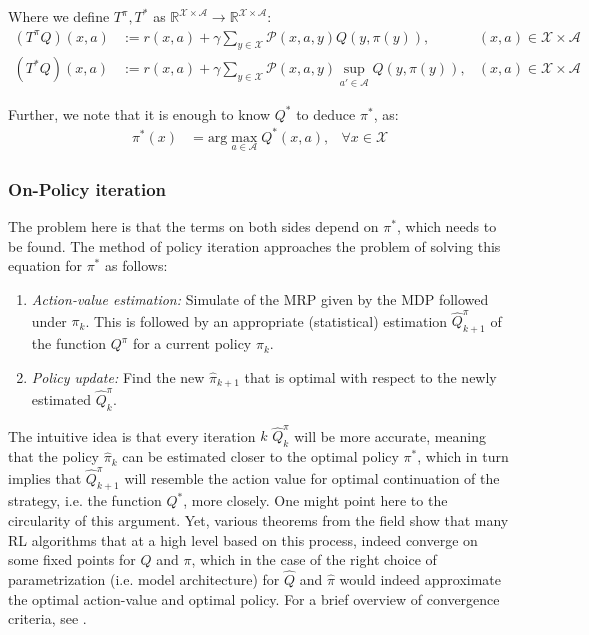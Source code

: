 \documentclass{article}
\theoremstyle{definition}
\theoremstyle{remark}
\newcommand{\stat}{\mathcal{X}}
\newcommand{\act}{\mathcal{A}}
\newcommand{\prob}{\mathcal{P}}
\newcommand{\R}{\mathbb{R}}
\begin{document}
Where we define $T^\pi, T^*$ as $\R^{\stat\times \act} \rightarrow \R^{\stat\times \act}$: 
\begin{align}
    (T^\pi Q)(x,a) &:= r(x,a) + \gamma \sum_{y\in \stat} \prob(x,a,y)Q(y,\pi(y)), & (x,a)\in \stat \times \act \\
    (T^* Q)(x,a) &:= r(x,a) + \gamma \sum_{y\in \stat} \prob(x,a,y)\sup_{a'\in \act}Q(y,\pi(y)), & (x,a)\in \stat \times \act
\end{align}

Further, we note that it is enough to know $Q^*$ to deduce $\pi^*$, as:
\begin{align}
    \pi^*(x) &= \text{arg}\max_{a\in \mathcal{A}} Q^* (x,a), &\forall x \in \mathcal{X}
\end{align}

\subsubsection{On-Policy iteration}
The problem here is that the terms on both sides depend on $\pi^*$, which needs to be found. The method of policy iteration approaches the problem of solving this equation for $\pi^*$ as follows:

\begin{enumerate}
    \item \textit{Action-value estimation:} Simulate of the MRP given by the MDP followed under $\pi_k$. This is followed by an appropriate (statistical) estimation $\hat Q^\pi_{k+1}$ of the function $Q^\pi$ for a current policy $\pi_k$.
    
    \item \textit{Policy update:} Find the new $\hat\pi_{k+1}$ that is optimal with respect to the newly estimated $\hat Q^\pi_k$.
\end{enumerate}

The intuitive idea is that every iteration $k$ $\hat Q^\pi_{k}$ will be more accurate, meaning that the policy $\hat\pi_k$ can be estimated closer to the optimal policy $\pi^*$, which in turn implies that $\hat Q^\pi_{k+1}$ will resemble the action value for optimal continuation of the strategy, i.e. the function $Q^*$, more closely. One might point here to the circularity of this argument. Yet, various theorems from the field show that many RL algorithms that at a high level based on this process, indeed converge on some fixed points for $Q$ and $\pi$, which in the case of the right choice of parametrization (i.e. model architecture) for $\hat Q$ and $\hat\pi$ would indeed approximate the optimal action-value and optimal policy. For a brief overview of convergence criteria, see \cite{leemondu}.
\end{document}
